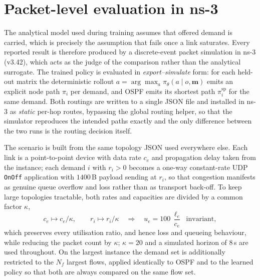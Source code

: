\section{Packet-level evaluation in ns-3}

The analytical model used during training assumes that offered demand is carried, which is
precisely the assumption that fails once a link saturates. Every reported result is therefore
produced by a discrete-event packet simulation in \mbox{ns-3} (v3.42), which acts as the judge of
the comparison rather than the analytical surrogate. The trained policy is evaluated in
\emph{export--simulate} form: for each held-out matrix the deterministic rollout
$a = \arg\max_a \pi_\theta(a\mid o,\mathbf{m})$ emits an explicit node path $\pi_i$ per demand,
and OSPF emits its shortest path $\pi_i^{\mathrm{sp}}$ for the same demand. Both routings are
written to a single JSON file and installed in \mbox{ns-3} as \emph{static} per-hop routes,
bypassing the global routing helper, so that the simulator reproduces the intended paths exactly
and the only difference between the two runs is the routing decision itself.

The scenario is built from the same topology JSON used everywhere else. Each link is a
point-to-point device with data rate $c_e$ and propagation delay taken from the instance; each
demand $i$ with $r_i > 0$ becomes a one-way constant-rate UDP \texttt{OnOff} application with
$1400$\,B payload sending at $r_i$, so that congestion manifests as genuine queue overflow and
loss rather than as transport back-off. To keep large topologies tractable, both rates and
capacities are divided by a common factor $\kappa$,
\begin{equation}
c_e \mapsto c_e/\kappa, \qquad r_i \mapsto r_i/\kappa
\quad\Longrightarrow\quad
u_e = 100\,\frac{\ell_e}{c_e} \;\; \text{invariant},
\end{equation}
which preserves every utilisation ratio, and hence loss and queueing behaviour, while reducing
the packet count by $\kappa$; $\kappa = 20$ and a simulated horizon of $8$\,s are used throughout.
On the largest instance the demand set is additionally restricted to the $N_f$ largest flows,
applied identically to OSPF and to the learned policy so that both are always compared on the
same flow set.

